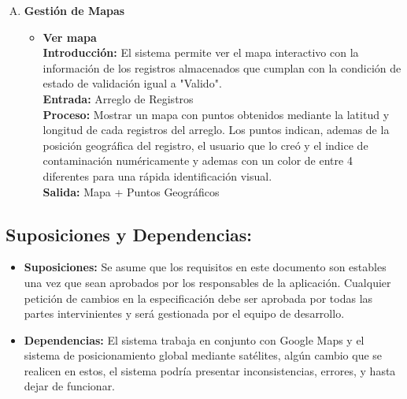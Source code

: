 \begin{enumerate}[A.]
      \item \textbf{Gestión de Mapas}
        \begin{itemize}
          \item \textbf{Ver mapa}
          \\ \textbf{Introducción:} El sistema permite ver el mapa interactivo con la información de los registros almacenados que cumplan con la condición de estado de validación igual a "Valido".
          \\ \textbf{Entrada:} Arreglo de Registros 
          \\ \textbf{Proceso:} Mostrar un mapa con puntos obtenidos mediante la latitud y longitud de cada registros del arreglo.
          Los puntos indican, ademas de la posición geográfica del registro, el usuario que lo creó y el indice de contaminación numéricamente y ademas con un color de entre 4 diferentes para una rápida identificación visual.
          \\ \textbf{Salida:} Mapa + Puntos Geográficos
        \end{itemize}

    \end{enumerate}

    \subsection{Suposiciones y Dependencias:}
      \begin{itemize}
        \item \textbf{Suposiciones:} Se asume que los requisitos en este documento son estables una vez que sean aprobados por los responsables de la aplicación. Cualquier petición de cambios en la especificación debe ser aprobada por todas las partes intervinientes y será gestionada por el equipo de desarrollo.
        \item \textbf{Dependencias:} El sistema trabaja en conjunto con Google Maps y el sistema de posicionamiento global mediante satélites, algún cambio que se realicen en estos, el sistema podría presentar inconsistencias, errores, y hasta dejar de funcionar.
      \end{itemize}

